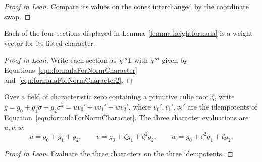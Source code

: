\begin{proof}[Proof in Lean]

\leanok

Compare its values on the cones interchanged by the coordinate swap.

\end{proof}

\begin{supportinglemma}

\label{helper:weightCharacters}


\leanok

Each of the four sections displayed in Lemma~\ref{lemma:heightformula} is a weight vector for its listed character.

\end{supportinglemma}

\begin{proof}[Proof in Lean]

\leanok


Write each section as $\chi^m\mathbf 1$ with $\chi^m$ given by Equations~\ref{eqn:formulaForNormCharacter} and~\ref{eqn:formulaForNormCharacter2}.

\end{proof}

\begin{supportinglemma}

\label{helper:characterCoordinates}


\leanok

Over a field of characteristic zero containing a primitive cube root $\zeta$, write $g=g_0+g_1\sigma+g_2\sigma^2=uv_0'+vv_1'+wv_2'$, where $v_0',v_1',v_2'$ are the idempotents of Equation~\ref{eqn:formulaForNormCharacter}. The three character evaluations are $u,v,w$: \[u=g_0+g_1+g_2,\qquad v=g_0+\zeta g_1+\zeta^2g_2,\qquad w=g_0+\zeta^2g_1+\zeta g_2.\]

\end{supportinglemma}

\begin{proof}[Proof in Lean]

\leanok

Evaluate the three characters on the three idempotents.

\end{proof}

